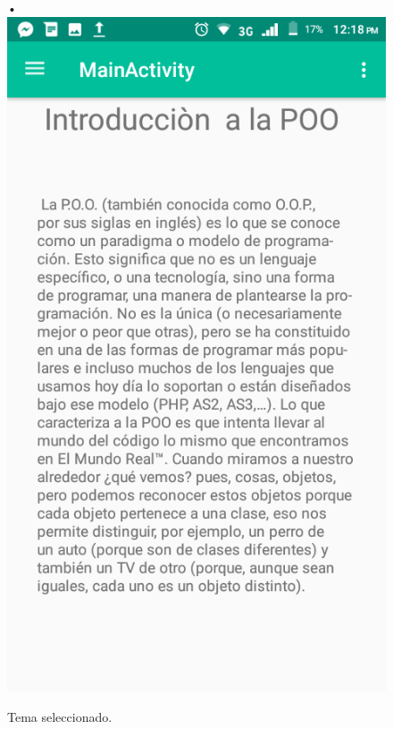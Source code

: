 \begin{center}
\begin{figure}[H]
•\includegraphics[scale=0.3]{img/5.png} 
\caption{Tema seleccionado.}
\end{figure}
\end{center}

